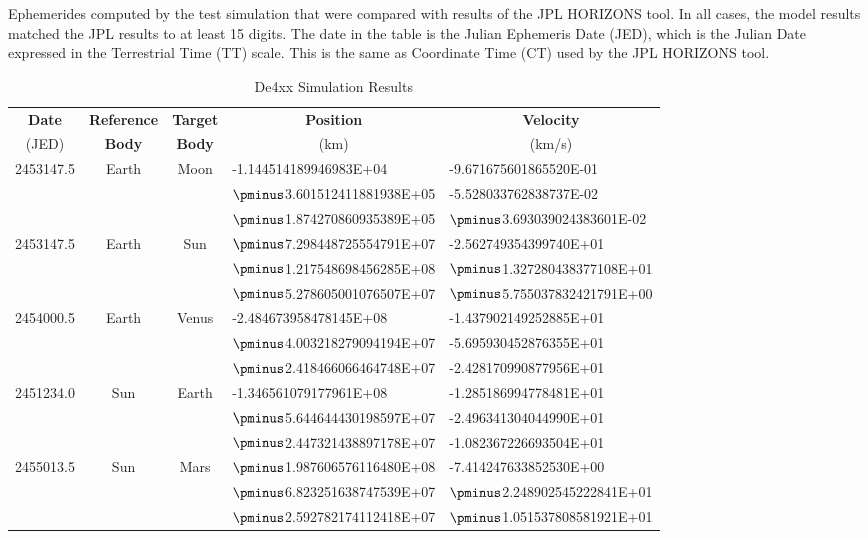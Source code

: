 \begin{table}[htp]
\caption{De4xx Simulation Results}
\label{tab:comp_results}
\vspace{1ex}
Ephemerides computed by the \ModelDesc test simulation that 
were compared with results of the JPL HORIZONS tool.  In all cases, the model 
results matched the JPL results to at least 15 digits. The date in the table 
is the Julian Ephemeris Date (JED), which is the Julian Date expressed in the 
Terrestrial Time (TT) scale.  This is the same as Coordinate Time (CT) used by 
the JPL HORIZONS tool.
\begin{center}
\vspace{1ex}
\begin{tabular}{||c c c l l|}
\hline
{\bf Date} & {\bf Reference} & {\bf Target} &
\multicolumn{1}{c}{\bf Position} & \multicolumn{1}{c|}{\bf Velocity} \\
(JED) & {\bf Body} & {\bf Body} &
\multicolumn{1}{c}{(km)} & \multicolumn{1}{c|}{(km/s)} \\
\hline\hline
\rule{0pt}{2.8ex}
2453147.5 & Earth & Moon &
    -1.144514189946983E+04 & -9.671675601865520E-01 \\
&&& $\pminus$3.601512411881938E+05 & -5.528033762838737E-02 \\
&&& $\pminus$1.874270860935389E+05 & $\pminus$3.693039024383601E-02 \\[10pt]

2453147.5 & Earth & Sun &
    $\pminus$7.298448725554791E+07 & -2.562749354399740E+01 \\
&&& $\pminus$1.217548698456285E+08 & $\pminus$1.327280438377108E+01 \\
&&& $\pminus$5.278605001076507E+07 & $\pminus$5.755037832421791E+00 \\[10pt]

2454000.5 & Earth & Venus &
    -2.484673958478145E+08 & -1.437902149252885E+01 \\
&&& $\pminus$4.003218279094194E+07 & -5.695930452876355E+01 \\
&&& $\pminus$2.418466066464748E+07 & -2.428170990877956E+01 \\[10pt]

2451234.0 & Sun & Earth &
    -1.346561079177961E+08 & -1.285186994778481E+01 \\
&&& $\pminus$5.644644430198597E+07 & -2.496341304044990E+01 \\
&&& $\pminus$2.447321438897178E+07 & -1.082367226693504E+01 \\[10pt]

2455013.5 & Sun & Mars &
    $\pminus$1.987606576116480E+08 & -7.414247633852530E+00 \\
&&& $\pminus$6.823251638747539E+07 & $\pminus$2.248902545222841E+01 \\
&&& $\pminus$2.592782174112418E+07 & $\pminus$1.051537808581921E+01
\rule[-1.4ex]{0pt}{0pt} \\
\hline
\end{tabular}
\end{center}
\end{table}
\clearpage